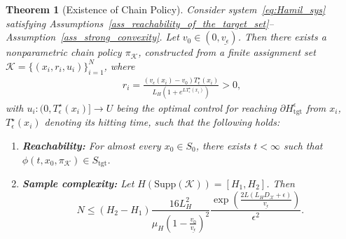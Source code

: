 \documentclass[letterpaper, 10 pt, conference]{ieeeconf}
\newtheorem{theorem}{Theorem}
\newcommand{\tgt}{\mathrm{tgt}}
\newcommand{\Supp}{\mathrm{Supp}}
\begin{document}
\begin{theorem}[Existence of Chain Policy]
\label{thm_existence_chain_policy}
Consider system~\eqref{eq:Hamil_sys} satisfying Assumptions~\ref{ass_reachability_of_the_target_set}--Assumption~\ref{ass_strong_convexity}. Let $v_0 \in (0,\underline{v_\epsilon})$.
Then there exists a nonparametric chain policy $\pi_{\mathcal{K}}$, constructed from a finite assignment set $\mathcal{K}=\{(x_i,r_i,u_i)\}_{i=1}^{N}$, where
\begin{align*}
r_i=\frac{(v_\epsilon(x_i)-v_0)T_\epsilon^\star(x_i)}{L_H(1+e^{LT_\epsilon^\star(x_i)})}>0,
\end{align*}
with $u_i:(0,T_\epsilon^\star(x_i)]\to {U}$ being the optimal control for reaching $\partial H_{\tgt}^\epsilon$ from $x_i$, $T_\epsilon^\star(x_i)$ denoting its hitting time, such that the following holds:
\begin{enumerate}
\item \textbf{Reachability:} For almost every $x_0\in S_0$, there exists $t<\infty$ such that $\phi(t,x_0,\pi_{\mathcal{K}})\in S_{\tgt}$.
\item \textbf{Sample complexity:} Let $H(\Supp(\mathcal{K}))=[H_1,H_2]$. Then
\[
N\leq (H_2-H_1)\frac{16L_H^2}{\mu_H (1-\frac{v_0}{\underline{v_\epsilon}})^2}\frac{\exp(\frac{2L(L_HD_{\mathcal{X}}+\epsilon)}{\underline{v_\epsilon}})}{\epsilon^2}.
\]
\end{enumerate}
\end{theorem}
\end{document}

